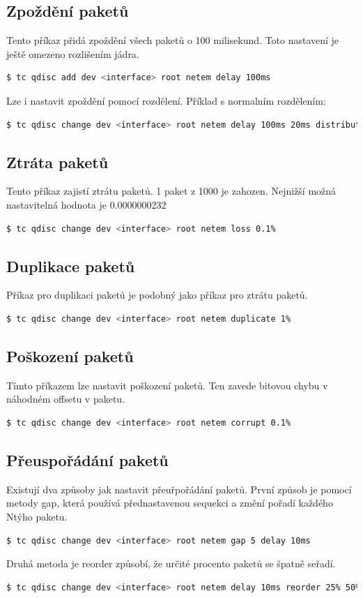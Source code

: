 \subsection*{Zpoždění paketů}
Tento příkaz přidá zpoždění všech paketů o 100 milisekund. Toto nastavení je ještě omezeno rozlišením jádra.
\begin{lstlisting}[language=bash]
    $ tc qdisc add dev <interface> root netem delay 100ms
\end{lstlisting}

Lze i nastavit zpoždění pomocí rozdělení. Příklad s normalním rozdělením:
\begin{lstlisting}[language=bash]
    $ tc qdisc change dev <interface> root netem delay 100ms 20ms distribution normal
\end{lstlisting}

\subsection*{Ztráta paketů}
Tento příkaz zajistí ztrátu paketů. 1 paket z 1000 je zahozen. Nejnižší možná nastavitelná hodnota je 0.0000000232%
\begin{lstlisting}[language=bash]
    $ tc qdisc change dev <interface> root netem loss 0.1%
\end{lstlisting}

\subsection*{Duplikace paketů}
Příkaz pro duplikaci paketů je podobný jako příkaz pro ztrátu paketů.
\begin{lstlisting}[language=bash]
    $ tc qdisc change dev <interface> root netem duplicate 1%
\end{lstlisting}

\subsection*{Poškození paketů}
Tímto příkazem lze nastavit poškození paketů. Ten zavede bitovou chybu v náhodném offsetu v paketu.
\begin{lstlisting}[language=bash]
    $ tc qdisc change dev <interface> root netem corrupt 0.1%
\end{lstlisting}

\subsection*{Přeuspořádání paketů}
Existují dva způsoby jak nastavit přeuřpořádání paketů.
První způsob je pomocí metody gap, která používá přednastavenou sequekci a změní pořadí každého Ntýho paketu.
\begin{lstlisting}[language=bash]
    $ tc qdisc change dev <interface> root netem gap 5 delay 10ms
\end{lstlisting}
Druhá metoda je reorder způsobí, že určité procento paketů se špatně seřadí.
\begin{lstlisting}[language=bash]
    $ tc qdisc change dev <interface> root netem delay 10ms reorder 25% 50%
\end{lstlisting}

